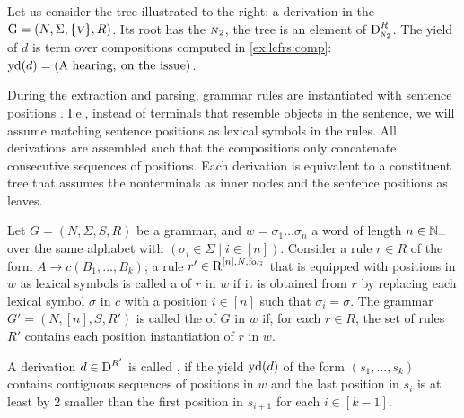\documentclass[../../document.tex]{subfiles}
\begin{document}
    \begin{wrapfigure}[6]{r}{0pt}
    \end{wrapfigure}
    \label{ex:lcfrs:deriv}
    Let us consider the tree illustrated to the right: a derivation in the  \(\mathrm{G} = (N, \Sigma, \{\textsc{\textsl{v}}\}, R)\).
    Its root has the  \(\textsc{\textsl{n}}_2\), the tree is an element of \(\operatorname{D}^R_{\textsc{\textsl{n}}_2}\).
    The yield of \(d\) is term over compositions computed in \cref{ex:lcfrs:comp}: \(\operatorname{yd}(d) = (\text{A hearing}, \: \text{on the issue})\).
    \exampleqed

    \vspace{\baselineskip}

    During the extraction and parsing, grammar rules are instantiated with sentence positions \citep[Definition~6.8]{Kal10}.
    I.e., instead of terminals that resemble objects in the sentence, we will assume matching sentence positions as lexical symbols in the rules.
    All derivations are assembled such that the compositions only concatenate consecutive sequences of positions.
    Each derivation is equivalent to a constituent tree that assumes the  nonterminals as inner nodes and the sentence positions as leaves.

    \begin{definition}
        Let \(G = (N, \varSigma, S, R)\) be a grammar, and \(w = \sigma_1 \ldots \sigma_n\) a word of length \(n \in \mathbb{N}_+\) over the same alphabet with \((\sigma_i \in \varSigma \mid i \in [n])\).
        Consider a rule \(r\in R\) of the form \(A \to c (B_1, \ldots, B_k)\); a rule \(r' \in \operatorname{R}^{[n],N,\operatorname{fo}_G}\) that is equipped with positions in \(w\) as lexical symbols is called a  of \(r\) in \(w\) if it is obtained from \(r\) by replacing each lexical symbol \(\sigma\) in \(c\) with a position \(i \in [n]\) such that \(\sigma_i = \sigma\).
        The grammar \(G' = (N, [n], S, R')\) is called the  of \(G\) in \(w\) if, for each \(r \in R\), the set of rules \(R'\) contains each position instantiation of \(r\) in \(w\).

        A derivation \(d \in \operatorname{D}^{R'}\) is called , if the yield \(\operatorname{yd}(d)\) of the form \((s_1, \ldots, s_k)\) contains contiguous sequences of positions in \(w\) and the last position in \(s_i\) is at least by 2 smaller than the first position in \(s_{i+1}\) for each \(i \in [k-1]\).
    \end{definition}
\end{document}
